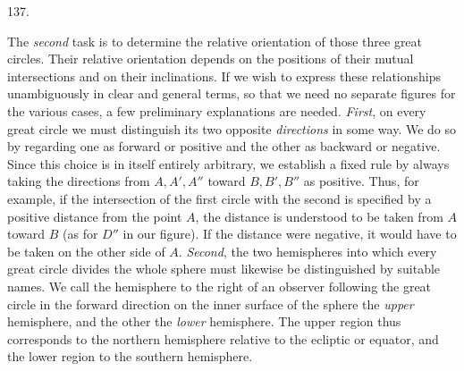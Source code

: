 \par{}\medskip
\begin{center}\hypertarget{native-183-article137}{}137.\end{center}
The \emph{second} task is to determine the relative orientation of those three great circles.
Their relative orientation depends on the positions of their mutual intersections and on their
inclinations. If we wish to express these relationships unambiguously in clear and general
terms, so that we need no separate figures for the various cases, a few preliminary explanations
are needed. \emph{First}, on every great circle we must distinguish its two opposite
\emph{directions} in some way. We do so by regarding one as forward or positive and the other as
backward or negative. Since this choice is in itself entirely arbitrary, we establish a fixed
rule by always taking the directions from $A,A',A''$ toward $B,B',B''$ as positive. Thus, for example, if
the intersection of the first circle with the second is specified by a positive distance from
the point $A$, the distance is understood to be taken from $A$ toward $B$ (as for $D''$ in
our figure). If the distance were negative, it would have to be taken on the other side of
$A$. \emph{Second}, the two hemispheres into which every great circle divides the whole sphere
must likewise be distinguished by suitable names. We call the hemisphere to the right of an
observer following the great circle in the forward direction on the inner surface of the sphere
the \emph{upper} hemisphere, and the other the \emph{lower} hemisphere. The upper region thus
corresponds to the northern hemisphere relative to the ecliptic or equator, and the lower region
to the southern hemisphere.

